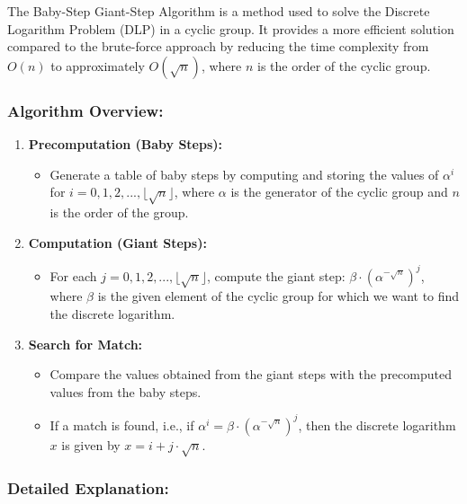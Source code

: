 \documentclass[11pt]{article}
\begin{document}
The Baby-Step Giant-Step Algorithm is a method used to solve the Discrete Logarithm Problem (DLP) in a cyclic group. It provides a more efficient solution compared to the brute-force approach by reducing the time complexity from $O(n)$ to approximately $O(\sqrt{n})$, where $n$ is the order of the cyclic group.

\subsubsection{Algorithm Overview:}

\begin{enumerate}
    \item \textbf{Precomputation (Baby Steps):}
    \begin{itemize}
        \item Generate a table of baby steps by computing and storing the values of $\alpha^i$ for $i = 0, 1, 2, ..., \lfloor \sqrt{n} \rfloor$, where $\alpha$ is the generator of the cyclic group and $n$ is the order of the group.
    \end{itemize}
    
    \item \textbf{Computation (Giant Steps):}
    \begin{itemize}
        \item For each $j = 0, 1, 2, ..., \lfloor \sqrt{n} \rfloor$, compute the giant step: $\beta \cdot (\alpha^{-\sqrt{n}})^j$, where $\beta$ is the given element of the cyclic group for which we want to find the discrete logarithm.
    \end{itemize}
    
    \item \textbf{Search for Match:}
    \begin{itemize}
        \item Compare the values obtained from the giant steps with the precomputed values from the baby steps.
        \item If a match is found, i.e., if $\alpha^i = \beta \cdot (\alpha^{-\sqrt{n}})^j$, then the discrete logarithm $x$ is given by $x = i + j \cdot \sqrt{n}$.
    \end{itemize}
\end{enumerate}

\subsubsection{Detailed Explanation:}
\end{document}
